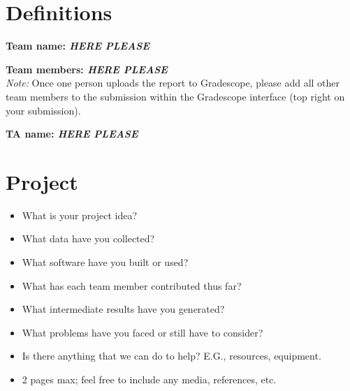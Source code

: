 \section*{Definitions}

\textbf{Team name: \emph{HERE PLEASE}}

\textbf{Team members: \emph{HERE PLEASE}}\\
\emph{Note:} Once one person uploads the report to Gradescope, please add all other team members to the submission within the Gradescope interface (top right on your submission).

\textbf{TA name: \emph{HERE PLEASE}}

\section*{Project}
\begin{itemize}
  \item What is your project idea?
  \item What data have you collected?
  \item What software have you built or used?
  \item What has each team member contributed thus far?
  \item What intermediate results have you generated?
  \item What problems have you faced or still have to consider?
  \item Is there anything that we can do to help? E.G., resources, equipment.
  \item 2 pages max; feel free to include any media, references, etc.
\end{itemize}


